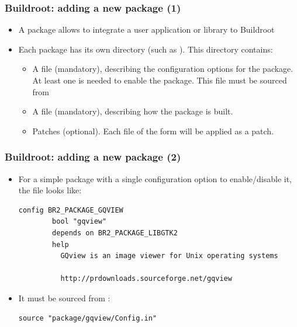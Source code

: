 \begin{frame}
  \frametitle{Buildroot: adding a new package (1)}
  \begin{itemize}
  \item A package allows to integrate a user application or library to
    Buildroot
  \item Each package has its own directory (such as
    ). This directory contains:
    \begin{itemize}
    \item A  file (mandatory), describing the
      configuration options for the package. At least one is needed to
      enable the package. This file must be sourced from
    \item A  file (mandatory), describing how the
      package is built.
    \item Patches (optional). Each file of the form
       will be applied as a patch.
    \end{itemize}
  \end{itemize}
\end{frame}

\begin{frame}[fragile]
  \frametitle{Buildroot: adding a new package (2)}
  \begin{itemize}
  \item For a simple package with a single configuration option to
    enable/disable it, the  file looks like:
\small
\begin{block}{}
\begin{verbatim}
config BR2_PACKAGE_GQVIEW
        bool "gqview"
        depends on BR2_PACKAGE_LIBGTK2
        help
          GQview is an image viewer for Unix operating systems

          http://prdownloads.sourceforge.net/gqview
\end{verbatim}
\end{block}
\normalsize
  \item It must be sourced from :
\small
\begin{block}{}
\begin{verbatim}
source "package/gqview/Config.in"
\end{verbatim}
\end{block}
  \end{itemize}
\end{frame}

